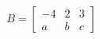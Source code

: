 \documentclass[preview]{standalone}
\begin{document}
\begin{align*}
B = \begin{bmatrix}
                        -4 & 2 & 3\\
                        a & b & c
                    \end{bmatrix}
\end{align*}
\end{document}

